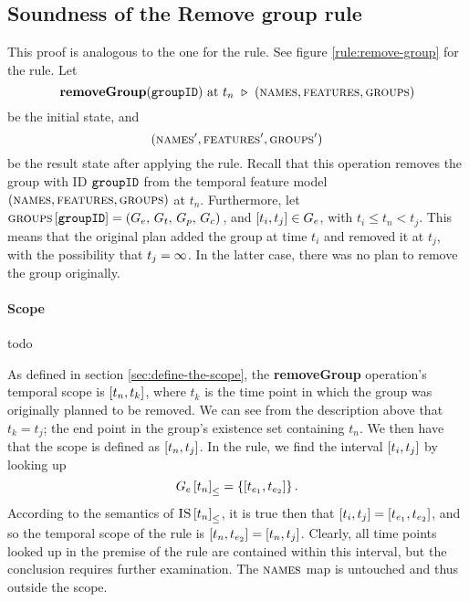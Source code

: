 \subsection{Soundness of the Remove group rule}
\label{sub:soundness-of-the-remove-group-rule}
This proof is analogous to the one for the  rule.
See figure \vref{rule:remove-group} for the  rule. Let
\[
      \textbf{removeGroup}(\texttt{groupID}) \text{ at } t_n \ \triangleright \  (\textsc{names}, \textsc{features}, \textsc{groups}{})
\]
be the initial state, and
\[
   (\textsc{names}', \textsc{features}', \textsc{groups}{}')
\]
be the result state after applying the  rule. Recall that this operation removes the group with ID $\texttt{groupID}$ from the temporal feature model $(\textsc{names}, \textsc{features}, \textsc{groups}{})$ at $t_n$. Furthermore, let $\textsc{groups}{} \left[ \texttt{groupID} \right] = \left(G_e,\, G_t,\, G_p,\, G_c\right){}$, and $\interval{t_i}{t_j} \in G_e$, with $t_i \leq t_n < t_j$. This means that the original plan added the group at time $t_i$ and removed it at $t_j$, with the possibility that $t_j = \infty$. In the latter case, there was no plan to remove the group originally.

\paragraph{Scope}
todo
\\

As defined in section \vref{sec:define-the-scope}, the \textbf{removeGroup} operation's temporal scope is $\interval{t_n}{t_k}$, where $t_k$ is the time point in which the group was originally planned to be removed. We can see from the description above that $t_k = t_j$; the end point in the group's existence set containing $t_n$. We then have that the scope is defined as $\interval{t_n}{t_j}$. In the rule, we find the interval $\interval{t_i}{t_j}$ by looking up
\[
   \containing{G_e}{t_n} = \set{\interval{t_{e_1}}{t_{e_2}}}.
\]
According to the semantics of ${\textsc{IS} \left[ t_n \right]}_{\leq}$, it is true then that $\interval{t_i}{t_j} = \interval{t_{e_1}}{t_{e_2}}$, and so the temporal scope of the rule is $\interval{t_n}{t_{e_2}} = \interval{t_n}{t_j}$. Clearly, all time points looked up in the premise of the rule are contained within this interval, but the conclusion requires further examination. The $\textsc{names}{}$ map is untouched and thus outside the scope. 

